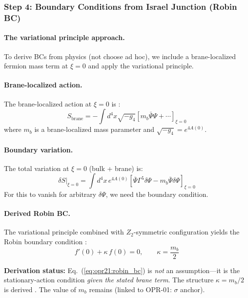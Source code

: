 \subsubsection{Step 4: Boundary Conditions from Israel Junction (Robin BC)}
\label{subsubsec:opr21_step4}

\paragraph{The variational principle approach.}
To derive BCs from physics (not choose ad hoc), we include a brane-localized
fermion mass term at $\xi = 0$ and apply the variational principle.

\paragraph{Brane-localized action.}
The brane-localized action at $\xi = 0$ is \tagP{}:
\begin{equation}
    S_{\text{brane}} = -\int d^4x \sqrt{-g_4} \left[m_b \bar{\Psi}\Psi + \cdots\right]_{\xi=0}
    \label{eq:opr21:brane_action}
\end{equation}
where $m_b$ is a brane-localized mass parameter and $\sqrt{-g_4} = e^{4A(0)}$.

\paragraph{Boundary variation.}
The total variation at $\xi = 0$ (bulk + brane) is:
\begin{equation}
    \delta S\big|_{\xi=0} = \int d^4x \, e^{4A(0)} \left[
        \bar{\Psi}\Gamma^5 \delta\Psi - m_b \bar{\Psi}\delta\Psi
    \right]_{\xi=0}
\end{equation}
For this to vanish for arbitrary $\delta\Psi$, we need the boundary condition.

\paragraph{Derived Robin BC.}
The variational principle combined with $Z_2$-symmetric configuration yields
the Robin boundary condition \tagDc{}:
\begin{equation}
    \boxed{
    f'(0) + \kappa\, f(0) = 0, \qquad \kappa = \frac{m_b}{2}
    }
    \label{eq:opr21:robin_bc}
\end{equation}

\textbf{Derivation status:} Eq.~(\ref{eq:opr21:robin_bc}) is \emph{not} an assumption---it
is the stationary-action condition \emph{given the stated brane term}.
The structure $\kappa = m_b/2$ is derived \tagDc{}.
The value of $m_b$ remains \tagP{} (linked to OPR-01: $\sigma$ anchor).

